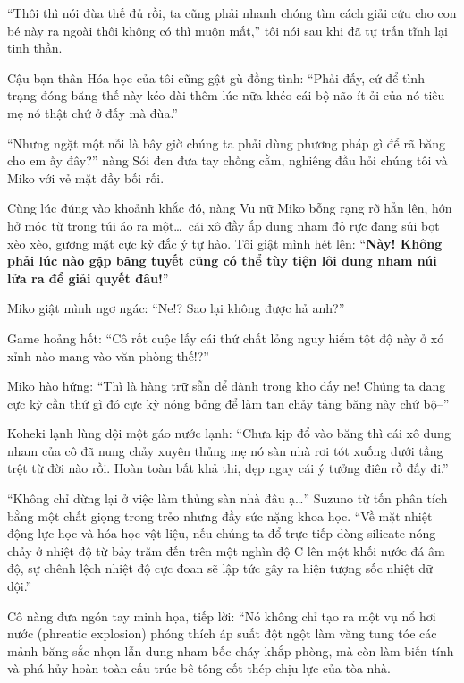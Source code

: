 \documentclass[../main.tex]{subfiles}
\begin{document}
``Thôi thì nói đùa thế đủ rồi, ta cũng phải nhanh chóng tìm cách giải cứu cho con bé này ra ngoài thôi không có thì muộn mất,'' tôi nói sau khi đã tự trấn tĩnh lại tinh thần.

Cậu bạn thân Hóa học của tôi cũng gật gù đồng tình: ``Phải đấy, cứ để tình trạng đóng băng thế này kéo dài thêm lúc nữa khéo cái bộ não ít ỏi của nó tiêu mẹ nó thật chứ ở đấy mà đùa.''

``Nhưng ngặt một nỗi là bây giờ chúng ta phải dùng phương pháp gì để rã băng cho em ấy đây?'' nàng Sói đen đưa tay chống cằm, nghiêng đầu hỏi chúng tôi và Miko với vẻ mặt đầy bối rối.

Cùng lúc đúng vào khoảnh khắc đó, nàng Vu nữ Miko bỗng rạng rỡ hẳn lên, hớn hở móc từ trong túi áo ra một\dots\ cái xô đầy ắp dung nham đỏ rực đang sủi bọt xèo xèo, gương mặt cực kỳ đắc ý tự hào. Tôi giật mình hét lên: ``\textbf{Này! Không phải lúc nào gặp băng tuyết cũng có thể tùy tiện lôi dung nham núi lửa ra để giải quyết đâu!}''


Miko giật mình ngơ ngác: ``Ne!? Sao lại không được hả anh?''

Game hoảng hốt: ``Cô rốt cuộc lấy cái thứ chất lỏng nguy hiểm tột độ này ở xó xỉnh nào mang vào văn phòng thế!?''

Miko hào hứng: ``Thì là hàng trữ sẵn để dành trong kho đấy ne! Chúng ta đang cực kỳ cần thứ gì đó cực kỳ nóng bỏng để làm tan chảy tảng băng này chứ bộ--''

Koheki lạnh lùng dội một gáo nước lạnh: ``Chưa kịp đổ vào băng thì cái xô dung nham của cô đã nung chảy xuyên thủng mẹ nó sàn nhà rơi tót xuống dưới tầng trệt từ đời nào rồi. Hoàn toàn bất khả thi, dẹp ngay cái ý tưởng điên rồ đấy đi.''

``Không chỉ dừng lại ở việc làm thủng sàn nhà đâu ạ\dots'' Suzuno từ tốn phân tích bằng một chất giọng trong trẻo nhưng đầy sức nặng khoa học. ``Về mặt nhiệt động lực học và hóa học vật liệu, nếu chúng ta đổ trực tiếp dòng silicate nóng chảy ở nhiệt độ từ bảy trăm đến trên một nghìn độ C lên một khối nước đá âm độ, sự chênh lệch nhiệt độ cực đoan sẽ lập tức gây ra hiện tượng sốc nhiệt dữ dội.''

Cô nàng đưa ngón tay minh họa, tiếp lời: ``Nó không chỉ tạo ra một vụ nổ hơi nước (phreatic explosion) phóng thích áp suất đột ngột làm văng tung tóe các mảnh băng sắc nhọn lẫn dung nham bốc cháy khắp phòng, mà còn làm biến tính và phá hủy hoàn toàn cấu trúc bê tông cốt thép chịu lực của tòa nhà.
\end{document}
